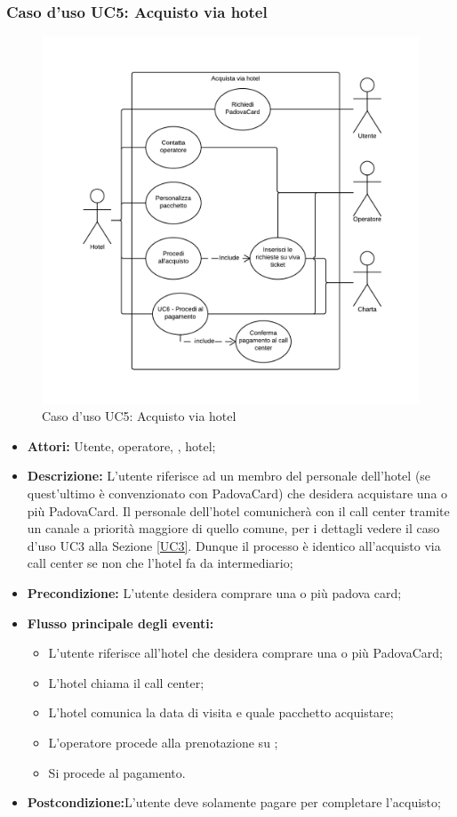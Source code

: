 \subsubsection{Caso d'uso UC5: Acquisto via hotel}\label{UCF5}
\begin{figure}[H]
\centering
\includegraphics[width=1\textwidth]{images/UC5.png}
\caption{Caso d'uso UC5: Acquisto via hotel}
\end{figure}
\begin{itemize}
\item \textbf{Attori:} Utente, operatore, \charta, hotel;
\item \textbf{Descrizione:} L'utente riferisce ad un membro del personale dell'hotel (se quest'ultimo è convenzionato con PadovaCard) che desidera acquistare una o più PadovaCard. Il personale dell'hotel comunicherà con il call center tramite un canale a priorità maggiore di quello comune, per i dettagli vedere il caso d'uso UC3 alla Sezione \ref{UC3}. Dunque il processo è identico all'acquisto via call center se non che l'hotel fa da intermediario;
\item \textbf{Precondizione:} L'utente desidera comprare una o più padova card;
\item \textbf{Flusso principale degli eventi:}
	\begin{itemize}
    	\item L'utente riferisce all'hotel che desidera comprare una o più PadovaCard;
		\item L'hotel chiama il call center;
		\item L'hotel comunica la data di visita e quale pacchetto acquistare;
        \item L'operatore procede alla prenotazione su \tlite;
        \item Si procede al pagamento.
	\end{itemize}
\item \textbf{Postcondizione:}L'utente deve solamente pagare per completare l'acquisto;
\end{itemize}

